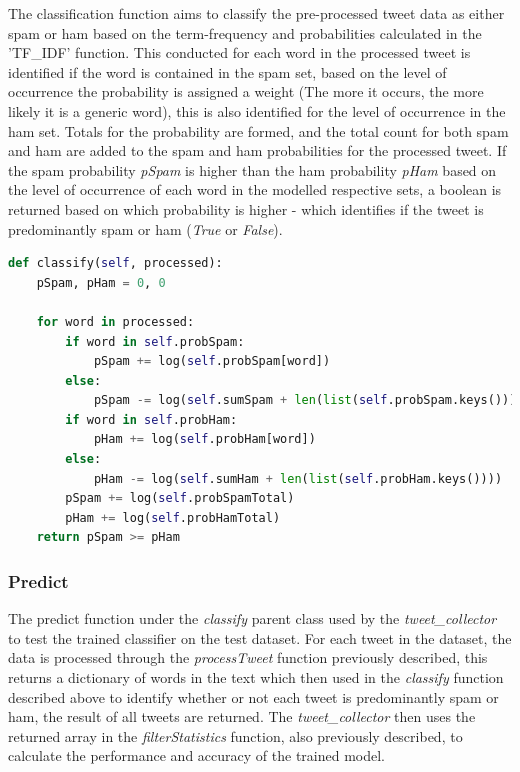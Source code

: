 \documentclass[oneside, 12pt]{article}
\begin{document}
		The classification function aims to classify the pre-processed tweet data as either spam or ham based on the term-frequency and probabilities calculated in the 'TF\_IDF' function. This conducted for each word in the processed tweet is identified if the word is contained in the spam set, based on the level of occurrence the probability is assigned a weight (The more it occurs, the more likely it is a generic word), this is also identified for the level of occurrence in the ham set. Totals for the probability are formed, and the total count for both spam and ham are added to the spam and ham probabilities for the processed tweet. If the spam probability \textit{pSpam} is higher than the ham probability \textit{pHam} based on the level of occurrence of each word in the modelled respective sets, a boolean is returned based on which probability is higher - which identifies if the tweet is predominantly spam or ham (\textit{True} or \textit{False}).
		
		\begin{lstlisting}[language=python, caption=Classify Function of Parent classifier class of spam\_filter.py]
def classify(self, processed):
	pSpam, pHam = 0, 0
	
	for word in processed:
		if word in self.probSpam:
			pSpam += log(self.probSpam[word])
		else:
			pSpam -= log(self.sumSpam + len(list(self.probSpam.keys())))
		if word in self.probHam:
			pHam += log(self.probHam[word])
		else:
			pHam -= log(self.sumHam + len(list(self.probHam.keys())))
		pSpam += log(self.probSpamTotal)
		pHam += log(self.probHamTotal)
	return pSpam >= pHam
		\end{lstlisting}
		
		\subsubsection{Predict}
		
		The predict function under the \textit{classify} parent class used by the \textit{tweet\_collector} to test the trained classifier on the test dataset. For each tweet in the dataset, the data is processed through the \textit{processTweet} function previously described, this returns a dictionary of words in the text which then used in the \textit{classify} function described above to identify whether or not each tweet is predominantly spam or ham, the result of all tweets are returned. The \textit{tweet\_collector} then uses the returned array in the \textit{filterStatistics} function, also previously described, to calculate the performance and accuracy of the trained model.
		
\end{document}
